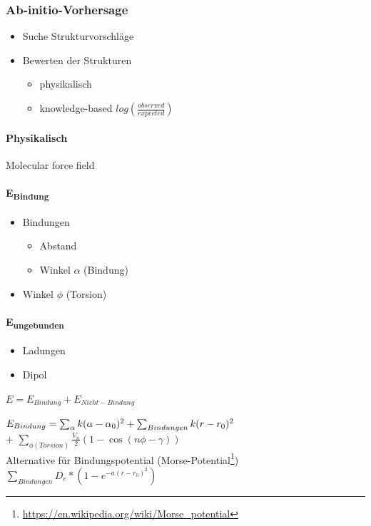 \subsubsection{Ab-initio-Vorhersage}
\begin{itemize}
 \item Suche Strukturvorschläge
 \item Bewerten der Strukturen
 \begin{itemize}
 \item physikalisch
 \item knowledge-based $log(\frac{observed}{expected})$
\end{itemize}
\end{itemize}
\paragraph{Physikalisch}
Molecular force field
\paragraph{E\textsubscript{Bindung}}
\begin{itemize}
 \item Bindungen
 \begin{itemize}
  \item Abstand
  \item Winkel $\alpha$ (Bindung)
 \end{itemize}
 \item Winkel $\phi$ (Torsion)
\end{itemize}
\paragraph{E\textsubscript{ungebunden}}
\begin{itemize}
  \item Ladungen
  \item Dipol
\end{itemize}
 $E=E_{Bindung} + E_{Nicht-Bindung}$
 
 $E_{Bindung} = \sum\nolimits_{\alpha} k(\alpha - \alpha_0)^2 \\
 + \sum\nolimits_{Bindungen} k (r - r_0)^2$ \\ 
 + $\sum\nolimits_{\phi (Torsion)} \frac{V_n}{2} (1 - \cos(n\phi - \gamma))$\\
 Alternative für Bindungspotential (Morse-Potential\footnote{\url{https://en.wikipedia.org/wiki/Morse_potential}})
 $\sum\nolimits_{Bindungen} D_e * (1 - e^{-a(r-r_0)^2})$
 
